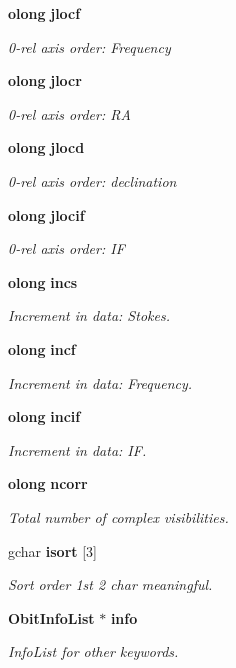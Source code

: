 \begin{CompactItemize}
{\bf olong} {\bf jlocf}
\begin{CompactList}\small\item\em 0-rel axis order: Frequency \item\end{CompactList}\item 
{\bf olong} {\bf jlocr}
\begin{CompactList}\small\item\em 0-rel axis order: RA \item\end{CompactList}\item 
{\bf olong} {\bf jlocd}
\begin{CompactList}\small\item\em 0-rel axis order: declination \item\end{CompactList}\item 
{\bf olong} {\bf jlocif}
\begin{CompactList}\small\item\em 0-rel axis order: IF \item\end{CompactList}\item 
{\bf olong} {\bf incs}
\begin{CompactList}\small\item\em Increment in data: Stokes. \item\end{CompactList}\item 
{\bf olong} {\bf incf}
\begin{CompactList}\small\item\em Increment in data: Frequency. \item\end{CompactList}\item 
{\bf olong} {\bf incif}
\begin{CompactList}\small\item\em Increment in data: IF. \item\end{CompactList}\item 
{\bf olong} {\bf ncorr}
\begin{CompactList}\small\item\em Total number of complex visibilities. \item\end{CompactList}\item 
gchar {\bf isort} [3]
\begin{CompactList}\small\item\em Sort order 1st 2 char meaningful. \item\end{CompactList}\item 
{\bf Obit\-Info\-List} $\ast$ {\bf info}
\begin{CompactList}\small\item\em Info\-List for other keywords. \item\end{CompactList}\end{CompactItemize}


